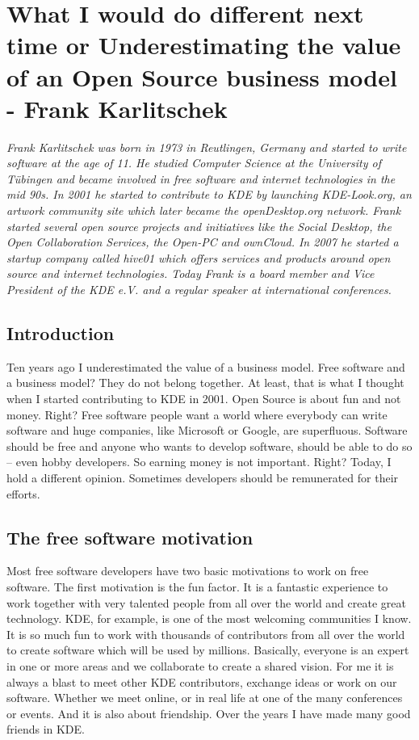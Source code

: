 \chapter{What I would do different next time or Underestimating the value of an Open Source business model - Frank Karlitschek}

\textit{Frank Karlitschek was born in 1973 in Reutlingen, Germany and started to write software at the age of 11. He studied Computer Science at the University of T\"ubingen and became involved in free software and internet technologies in the mid 90s. In 2001 he started to contribute to KDE by launching KDE-Look.org, an artwork community site which later became the openDesktop.org network. Frank started several open source projects and initiatives like the Social Desktop, the Open Collaboration Services, the Open-PC and ownCloud. In 2007 he started a startup company called hive01 which offers services and products around open source and internet technologies.
Today Frank is a board member and Vice President of the KDE e.V. and a regular speaker at international conferences.}

\section*{Introduction}

Ten years ago I underestimated the value of a business model. Free software and a business model? They do not belong together. At least, that is what I thought when I started contributing to KDE in 2001. Open Source is about fun and not money. Right? Free software people want a world where everybody can write software and huge companies, like Microsoft or Google, are superfluous. Software should be free and anyone who wants to develop software, should be able to do so -- even hobby developers. So earning money is not important. Right? Today, I hold a different opinion. Sometimes developers should be remunerated for their efforts.  

\section*{The free software motivation}

Most free software developers have two basic motivations to work on free software. The first motivation is the fun factor. It is a fantastic experience to work together with very talented people from all over the world and create great technology. KDE, for example, is one of the most welcoming communities I know. It is so much fun to work with thousands of contributors from all over the world to create software which will be used by millions. Basically, everyone is an expert in one or more areas and we collaborate to create a shared vision. For me it is always a blast to meet other KDE contributors, exchange ideas or work on our software. Whether we meet online, or in real life at one of the many conferences or events. And it is also about friendship. Over the years I have made many good friends in KDE.

